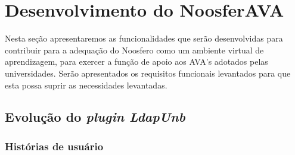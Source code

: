 \section{Desenvolvimento do NoosferAVA}
\label{desen-noosferAVA}

Nesta seção apresentaremos as funcionalidades que serão desenvolvidas para contribuir para a adequação do Noosfero como um ambiente virtual de aprendizagem, para exercer a função de apoio aos AVA's adotados pelas universidades. Serão apresentados os requisitos funcionais levantados para que esta possa suprir as necessidades levantadas. 

\subsection{Evolução do \textit{plugin LdapUnb}}

\subsubsection*{Histórias de usuário}


